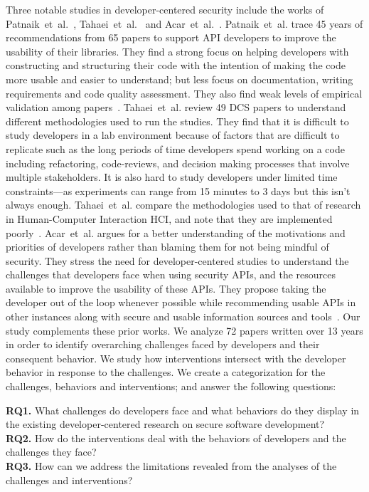 \documentclass[conference]{IEEEtran}
\newcommand{\etal}[0]{et~al{.}}
\begin{document}
Three notable studies in developer-centered security include the works of Patnaik~\etal{}~\cite{patnaik2021classics}, Tahaei~\etal{}~\cite{tahaei2019} and Acar~\etal{}~\cite{acar2016}.
Patnaik~\etal{} trace 45 years of recommendations from 65 papers to support API developers to improve the usability of their libraries. They find a strong focus on helping developers with constructing and structuring their code with the intention of making the code more usable and easier to understand; but less focus on documentation, writing requirements and code quality assessment. They also find weak levels of empirical validation among papers~\cite{patnaik2021classics}.
%
Tahaei~\etal{} review 49 \ac{DCS} papers to understand different methodologies used to run the studies. They find that it is difficult to study developers in a lab environment because of factors that are difficult to replicate such as the long periods of time developers spend working on a code including refactoring, code-reviews, and decision making processes that involve multiple stakeholders. It is also hard to study developers under limited time constraints---as experiments can range from 15 minutes to 3 days but this isn't always enough. Tahaei~\etal{} compare the methodologies used to that of research in Human-Computer Interaction \ac{HCI}, and note that they are implemented poorly~\cite{tahaei2019}.
%
Acar~\etal{} argues for a better understanding of the motivations and priorities of developers rather than blaming them for not being mindful of security. They stress the need for developer-centered studies to understand the challenges that developers face when using security APIs, and the resources available to improve the usability of these APIs. They propose taking the developer out of the loop whenever possible while recommending usable APIs in other instances along with secure and usable information sources and tools~\cite{acar2016}. 
%
Our study complements these prior works. We analyze 72 papers written over 13 years in order to identify overarching challenges faced by developers and their consequent behavior. We study how interventions intersect with the developer behavior in response to the challenges. We create a categorization for the challenges, behaviors and interventions; and answer the following questions:

\begin{framed}
          \noindent
    \textbf{RQ1.}
          What challenges do developers face and what behaviors do they display in the existing developer-centered research on secure software development?\\
         \noindent
    \textbf{RQ2.}
          How do the interventions deal with the behaviors of developers and the challenges they face?\\
          \noindent
    \textbf{RQ3.}
          How can we address the limitations revealed from the analyses of the challenges and interventions?
\end{framed}
\end{document}
